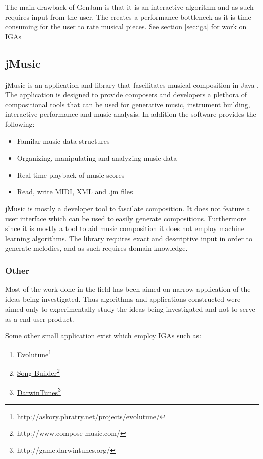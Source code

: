 The main drawback of GenJam is that it is an interactive algorithm and as such requires input from the user. The creates a performance bottleneck as it is time consuming for the user to rate musical pieces.
See section \ref{sec:iga} for work on \acsp{IGA}

\subsection{jMusic}
jMusic is an application and library that fascilitates musical composition in Java \cite{Sorensen}. The application is designed to provide composers and developers a plethora of compositional tools that can be used for generative music, instrument building, interactive performance and music analysis. In addition the software provides the following:
\begin{itemize}
\item Familar music data structures
\item Organizing, manipulating and analyzing music data
\item Real time playback of music scores
\item Read, write \ac{MIDI}, \ac{XML} and .jm files
\end{itemize}

jMusic is mostly a developer tool to fascilate composition. It does not feature a user interface which can be used to easily generate compositions. Furthermore since it is mostly a tool to aid music composition it does not employ machine learning algorithms. The library requires exact and descriptive input in order to generate melodies, and as such requires domain knowledge.

\subsubsection{Other}
Most of the work done in the field has been aimed on narrow application of the ideas being investigated. Thus algorithms and applications constructed were aimed only to experimentally study the ideas being investigated and not to serve as a end-user product. 

Some other small application exist which employ \acp{IGA} such as:
\begin{enumerate}
\item \href{http://askory.phratry.net/projects/evolutune/}{Evolutune}\footnote{http://askory.phratry.net/projects/evolutune/}
\item \href{http://www.compose-music.com/}{Song Builder}\footnote{http://www.compose-music.com/}
\item \href{http://game.darwintunes.org/}{DarwinTunes}\footnote{http://game.darwintunes.org/}
\end{enumerate}

